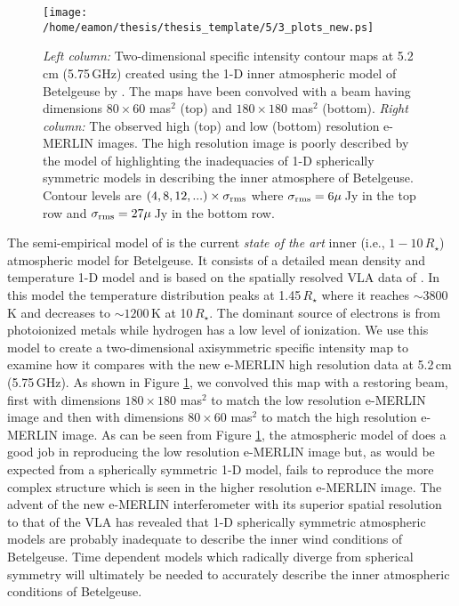 \begin{figure}[!t]
\centering 
          \texttt{[image: /home/eamon/thesis/thesis\_template/5/3\_plots\_new.ps]}
\caption[1-D model vs. e-MERLIN observations]{\textit{Left column:} Two-dimensional specific intensity contour maps at 5.2\,cm (5.75\,GHz) created using the 1-D inner atmospheric model of Betelgeuse by \cite{harper_2001}. The maps have been convolved with a beam having dimensions $80\times 60$ mas$^2$ (top) and $180\times 180$ mas$^2$ (bottom). \textit{Right column:} The observed high (top) and low (bottom) resolution e-MERLIN images. The high resolution image is poorly described by the model of \cite{harper_2001} highlighting the inadequacies of 1-D spherically symmetric models in describing the inner atmosphere of Betelgeuse. Contour levels are $(4,8,12,...)\times \sigma _{\rm{rms}}$ where $\sigma _{\rm{rms}} = 6\mu$\,Jy in the top row and $\sigma _{\rm{rms}} = 27\mu$\,Jy in the bottom row.}
\label{fig:5.15}
\end{figure}

The semi-empirical model of \cite{harper_2001} is the current \textit{state of the art} inner (i.e., $1 - 10\,R_{\star}$) atmospheric model for Betelgeuse. It consists of a detailed mean density and temperature 1-D model and is based on the spatially resolved VLA data of \cite{lim_1998}. In this model the temperature distribution peaks at 1.45\,$R_{\star}$ where it reaches $\sim 3800$\,K and decreases to $\sim 1200$\,K at 10\,$R_{\star}$. The dominant source of electrons is from photoionized metals while hydrogen has a low level of ionization. We use this model to create a two-dimensional axisymmetric specific intensity map to examine how it compares with the new e-MERLIN high resolution data at 5.2\,cm (5.75\,GHz). As shown in Figure \ref{fig:5.15}, we convolved this map with a restoring beam, first with dimensions $180\times 180$ mas$^2$ to match the low resolution e-MERLIN image and then with dimensions $80\times 60$ mas$^2$ to match the high resolution e-MERLIN image. As can be seen from Figure  \ref{fig:5.15}, the atmospheric model of \cite{harper_2001} does a good job in reproducing the low resolution e-MERLIN image but, as would be expected from a spherically symmetric 1-D model, fails to reproduce the more complex structure which is seen in the higher resolution e-MERLIN image. The advent of the new e-MERLIN interferometer with its superior spatial resolution to that of the VLA has revealed that 1-D spherically symmetric atmospheric models are probably inadequate to describe the inner wind conditions of Betelgeuse. Time dependent models which radically diverge from spherical symmetry will ultimately be needed to accurately describe the inner atmospheric conditions of Betelgeuse.

